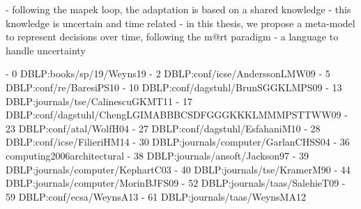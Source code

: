 - following the \gls{mapek} loop, the adaptation is based on a shared knowledge
- this knowledge is uncertain and time related
- in this thesis, we propose a meta-model to represent decisions over time, following the \gls{m@rt} paradigm
- a language to handle uncertainty







- 0  DBLP:books/sp/19/Weyns19
- 2  DBLP:conf/icse/AnderssonLMW09
- 5  DBLP:conf/re/BaresiPS10
- 10 DBLP:conf/dagstuhl/BrunSGGKLMPS09
- 13 DBLP:journals/tse/CalinescuGKMT11
- 17 DBLP:conf/dagstuhl/ChengLGIMABBBCSDFGGGKKKLMMMPSTTWW09
- 23 DBLP:conf/atal/WolfH04
- 27 DBLP:conf/dagstuhl/EsfahaniM10
- 28 DBLP:conf/icse/FilieriHM14
- 30 DBLP:journals/computer/GarlanCHSS04
- 36 computing2006architectural
- 38 DBLP:journals/ansoft/Jackson97
- 39 DBLP:journals/computer/KephartC03
- 40 DBLP:journals/tse/KramerM90
- 44 DBLP:journals/computer/MorinBJFS09
- 52 DBLP:journals/taas/SalehieT09
- 59 DBLP:conf/ecsa/WeynsA13
- 61 DBLP:journals/taas/WeynsMA12